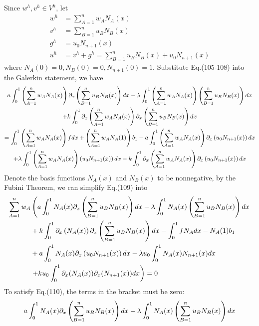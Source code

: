 \begin{solution}
	Since $w^h, v^h \in V^h$, let 
	\begin{align}
		w^h &= \sum_{A=1}^n w_A N_A(x) \\
		v^h &= \sum_{B=1}^n u_B N_B(x) \\
		g^h &= u_0 N_{n+1}(x) \\
		u^h &= v^h + g^h = \sum_{B=1}^n u_B N_B(x) + u_0 N_{n+1}(x)
	\end{align}
	where $N_A(0) = 0, N_B (0) = 0, N_{n+1}(0) = 1$. Substitute Eq.(105-108) into the Galerkin statement, we have
	\begin{gather}
			a\int_0^1 \left(\sum_{A=1}^n w_A N_A(x)\right) \partial_{x}\left( \sum_{B=1}^n u_B N_B(x) \right) dx - \lambda \int_0^1 \left(\sum_{A=1}^n w_A N_A(x)\right) \left( \sum_{B=1}^n u_B N_B(x) \right) dx \notag \\
			+ k \int_0^1 \partial_{x}\left(\sum_{A=1}^n w_A N_A(x)\right) \partial_{x}\left( \sum_{B=1}^n u_B N_B(x) \right) dx \notag \\
		= \int_0^1 \left(\sum_{A=1}^n w_A N_A(x)\right) f dx + \left(\sum_{A=1}^n w_A N_A(1)\right)b_1 - a\int_0^1 \left(\sum_{A=1}^n w_A N_A(x)\right) \partial_{x}\left( u_0 N_{n+1}(x) \right) dx \notag \\
		+ \lambda \int_0^1 \left(\sum_{A=1}^n w_A N_A(x)\right) \left( u_0 N_{n+1}(x) \right) dx - k \int_0^1 \partial_{x}\left(\sum_{A=1}^n w_A N_A(x)\right) \partial_{x}\left( u_0 N_{n+1}(x) \right) dx
	\end{gather}
	Denote the basis functions $N_A(x)$ and $N_B(x)$ to be nonnegative, by the Fubini Theorem, we can simplify Eq.(109) into
	\begin{align}
		\sum_{A=1}^n w_A & \left( a\int_0^1 N_A(x) \partial_{x} \left( \sum_{B=1}^n u_B N_B(x) \right) dx - \lambda \int_0^1 N_A(x) \left( \sum_{B=1}^n u_B N_B(x) \right) dx \notag \right. \notag \\
		&+ k \int_0^1 \partial_{x}\left(N_A(x)\right) \partial_{x}\left( \sum_{B=1}^n u_B N_B(x) \right) dx - \int_0^1 f N_A dx - N_A(1) b_1 \notag \\
		&+ a \int_0^1 N_A(x) \partial_{x}\left( u_0 N_{n+1}(x) \right) dx - \lambda u_0 \int_0^1 N_A(x) N_{n+1}(x) dx \notag \\
		&\left. + k u_0 \int_0^1 \partial_{x}(N_A(x)) \partial_{x}(N_{n+1}(x)) dx \right) = 0
	\end{align}
	To satisfy Eq.(110), the terms in the bracket must be zero:
	\begin{gather}
		a\int_0^1 N_A(x) \partial_{x} \left( \sum_{B=1}^n u_B N_B(x) \right) dx - \lambda \int_0^1 N_A(x) \left( \sum_{B=1}^n u_B N_B(x) \right) dx \notag \\

\end{gather}
\end{solution}

